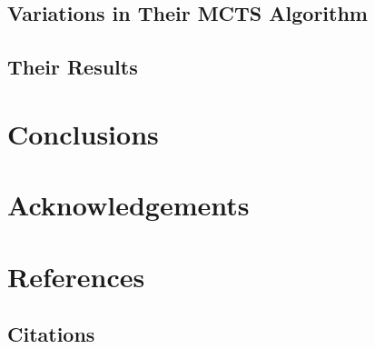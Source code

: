\documentclass{sig-alternate}
\begin{document}
\subsection{Variations in Their MCTS Algorithm}

\subsection{Their Results}

\section{Conclusions}

\section{Acknowledgements}

\section{References}

\subsection{Citations}


  
\end{document}
